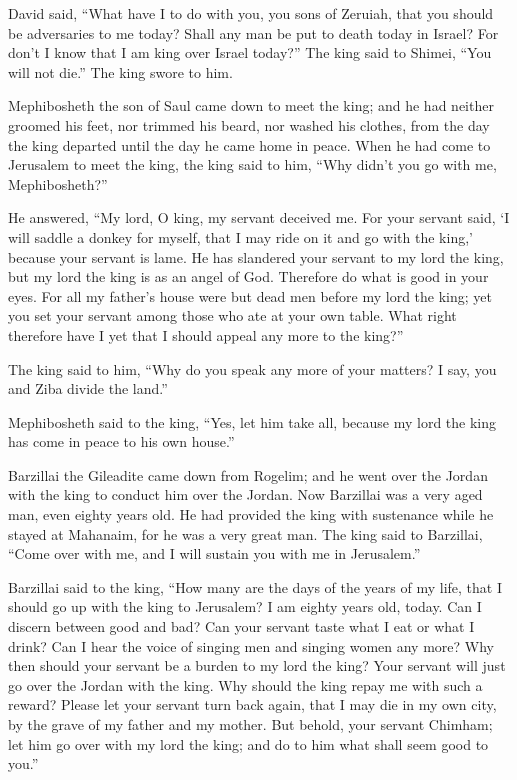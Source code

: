  David said, ``What have I to do with you, you sons of
Zeruiah, that you should be adversaries to me today? Shall any man be
put to death today in Israel? For don't I know that I am king over
Israel today?''  The king said to Shimei, ``You will not
die.'' The king swore to him.

 Mephibosheth the son of Saul came down to meet the king;
and he had neither groomed his feet, nor trimmed his beard, nor washed
his clothes, from the day the king departed until the day he came home
in peace.  When he had come to Jerusalem to meet the king,
the king said to him, ``Why didn't you go with me, Mephibosheth?''

 He answered, ``My lord, O king, my servant deceived me.
For your servant said, `I will saddle a donkey for myself, that I may
ride on it and go with the king,' because your servant is lame.
 He has slandered your servant to my lord the king, but my
lord the king is as an angel of God. Therefore do what is good in your
eyes.  For all my father's house were but dead men before
my lord the king; yet you set your servant among those who ate at your
own table. What right therefore have I yet that I should appeal any more
to the king?''

 The king said to him, ``Why do you speak any more of your
matters? I say, you and Ziba divide the land.''

 Mephibosheth said to the king, ``Yes, let him take all,
because my lord the king has come in peace to his own house.''

 Barzillai the Gileadite came down from Rogelim; and he
went over the Jordan with the king to conduct him over the Jordan.
 Now Barzillai was a very aged man, even eighty years old.
He had provided the king with sustenance while he stayed at Mahanaim,
for he was a very great man.  The king said to Barzillai,
``Come over with me, and I will sustain you with me in Jerusalem.''

 Barzillai said to the king, ``How many are the days of the
years of my life, that I should go up with the king to Jerusalem?
 I am eighty years old, today. Can I discern between good
and bad? Can your servant taste what I eat or what I drink? Can I hear
the voice of singing men and singing women any more? Why then should
your servant be a burden to my lord the king?  Your servant
will just go over the Jordan with the king. Why should the king repay me
with such a reward?  Please let your servant turn back
again, that I may die in my own city, by the grave of my father and my
mother. But behold, your servant Chimham; let him go over with my lord
the king; and do to him what shall seem good to you.''

